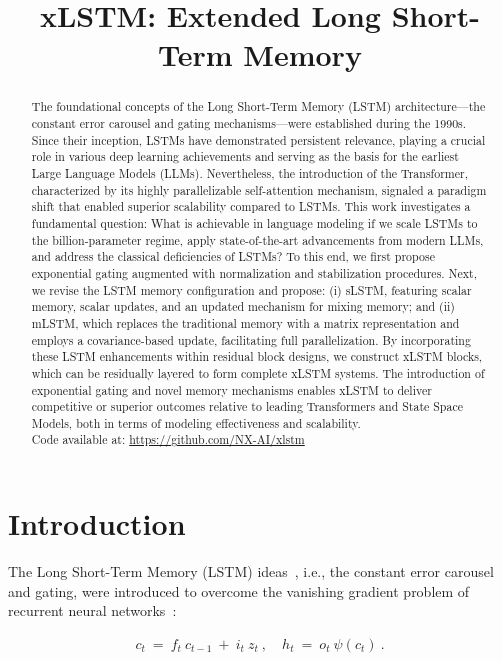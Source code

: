 \title{xLSTM: Extended Long Short-Term Memory}

\begin{abstract}
The foundational concepts of the Long Short-Term Memory (LSTM) architecture—the constant error carousel and gating mechanisms—were established during the 1990s. Since their inception, LSTMs have demonstrated persistent relevance, playing a crucial role in various deep learning achievements and serving as the basis for the earliest Large Language Models (LLMs). Nevertheless, the introduction of the Transformer, characterized by its highly parallelizable self-attention mechanism, signaled a paradigm shift that enabled superior scalability compared to LSTMs. This work investigates a fundamental question: What is achievable in language modeling if we scale LSTMs to the billion-parameter regime, apply state-of-the-art advancements from modern LLMs, and address the classical deficiencies of LSTMs? To this end, we first propose exponential gating augmented with normalization and stabilization procedures. Next, we revise the LSTM memory configuration and propose: (i) sLSTM, featuring scalar memory, scalar updates, and an updated mechanism for mixing memory; and (ii) mLSTM, which replaces the traditional memory with a matrix representation and employs a covariance-based update, facilitating full parallelization. By incorporating these LSTM enhancements within residual block designs, we construct xLSTM blocks, which can be residually layered to form complete xLSTM systems. The introduction of exponential gating and novel memory mechanisms enables xLSTM to deliver competitive or superior outcomes relative to leading Transformers and State Space Models, both in terms of modeling effectiveness and scalability.\\
Code available at: \url{https://github.com/NX-AI/xlstm}
\end{abstract}

\section{Introduction}
\label{sec:intro}

The Long Short-Term Memory (LSTM) ideas~\citep{Hochreiter:91,Hochreiter:97nips,Hochreiter:97}, i.e., the constant error carousel and gating, were introduced to overcome the vanishing gradient problem of recurrent neural networks~\citep{Hochreiter:91,Hochreiter:00book}:

\begin{align}
\label{eq:lstm_idea}
  c_t \ = \ f_t \ c_{t-1} \ + \ 
          i_t \  z_t \ , \quad  
          h_t \ = \ o_t \ \psi({c_t}) \ . 
\end{align}

